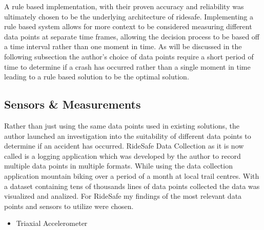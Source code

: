 A rule based implementation, with their proven accuracy and reliability was ultimately chosen to be the underlying architecture of ridesafe. Implementing a rule based system allows for more context to be considered measuring different data points at separate time frames, allowing the decision process to be based off a time interval rather than one moment in time. As will be discussed in the following subsection the author's choice of data points require a short period of time to determine if a crash has occurred rather than a single moment in time leading to a rule based solution to be the optimal solution.     


\subsection{Sensors \& Measurements}


Rather than just using the same data points used in existing solutions, the author launched an investigation into the suitability of different data points to determine if an accident has occurred. RideSafe Data Collection as it is now called is a logging application which was developed by the author to record multiple data points in multiple formats. While using the data collection application mountain biking over a period of a month at local trail centres. With a dataset containing tens of thousands lines of data points collected the data was visualized  and analized. For RideSafe my findings of the most relevant data points and sensors to utilize were chosen. 
\vspace{1cm}
\begin{itemize}
\item Triaxial Accelerometer
\end{itemize}


